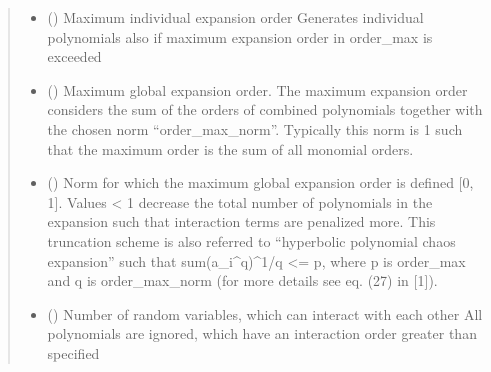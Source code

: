 \documentclass[letterpaper,10pt,english,openany,oneside]{sphinxmanual}
\begin{document}
\begin{fulllineitems}
\begin{fulllineitems}
\begin{quote}
\begin{description}
\begin{itemize}
\item {} 
 (\sphinxstyleliteralemphasis{\sphinxupquote{{[}}}\sphinxstyleliteralemphasis{\sphinxupquote{{]} }}) \textendash{} Maximum individual expansion order
Generates individual polynomials also if maximum expansion order in order\_max is exceeded

\item {} 
 () \textendash{} Maximum global expansion order.
The maximum expansion order considers the sum of the orders of combined polynomials together with the
chosen norm “order\_max\_norm”. Typically this norm is 1 such that the maximum order is the sum of all
monomial orders.

\item {} 
 () \textendash{} Norm for which the maximum global expansion order is defined {[}0, 1{]}. Values \textless{} 1 decrease the total number
of polynomials in the expansion such that interaction terms are penalized more. This truncation scheme
is also referred to “hyperbolic polynomial chaos expansion” such that sum(a\_i\textasciicircum{}q)\textasciicircum{}1/q \textless{}= p,
where p is order\_max and q is order\_max\_norm (for more details see eq. (27) in {[}1{]}).

\item {} 
 () \textendash{} Number of random variables, which can interact with each other
All polynomials are ignored, which have an interaction order greater than specified

\end{itemize}

\end{description}\end{quote}

\end{fulllineitems}
\end{fulllineitems}
\end{document}
